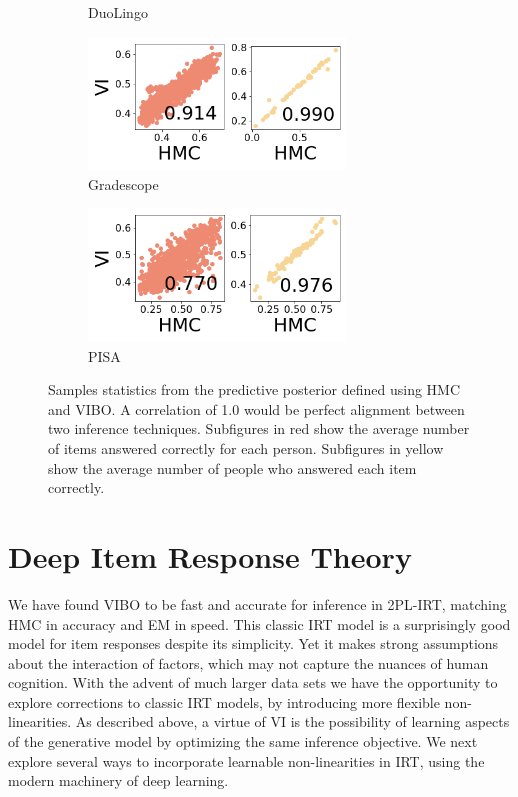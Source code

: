 \begin{figure}
\begin{subfigure}[b]{0.5\textwidth}
        \caption{DuoLingo}
    \end{subfigure}
    \begin{subfigure}[b]{0.5\textwidth}
        \centering
        \includegraphics[width=0.75\textwidth]{images/chapter7/posterior_predictives/gradescope.png}
        \caption{Gradescope}
    \end{subfigure}
    \begin{subfigure}[b]{0.5\textwidth}
        \centering
        \includegraphics[width=0.75\textwidth]{images/chapter7/posterior_predictives/pisa.png}
        \caption{PISA}
    \end{subfigure}
    \caption{Samples statistics from the predictive posterior defined using HMC and VIBO. A correlation of 1.0 would be perfect alignment between two inference techniques. Subfigures in red show the average number of items answered correctly for each person. Subfigures in yellow show the average number of people who answered each item correctly.}
\end{figure}

\section{Deep Item Response Theory}
We have found VIBO to be fast and accurate for inference in 2PL-IRT, matching HMC in accuracy and EM in speed.
This classic IRT model is a surprisingly good model for item responses despite its simplicity.
Yet it makes strong assumptions about the interaction of factors, which may not capture the nuances of human cognition.
With the advent of much larger data sets we have the opportunity to explore corrections to classic IRT models, by introducing more flexible non-linearities.
As described above, a virtue of VI is the possibility of learning aspects of the generative model by optimizing the same inference objective.
We next explore several ways to incorporate learnable non-linearities in IRT, using the modern machinery of deep learning. 

